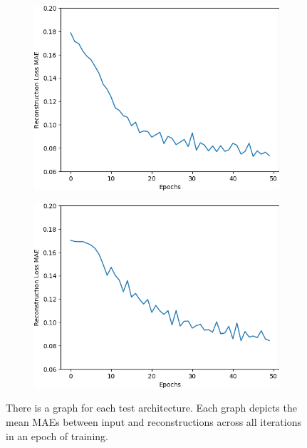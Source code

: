\begin{figure}[H]
    \centering
    \begin{subfigure}{.25\textwidth}
        \centering
        \includegraphics[width=\textwidth]
        {images/figures/experiments_architecture/mae_graphKernel5adjusted16x16x32_dim1024.png}
        \caption{}
    \end{subfigure}%
    \begin{subfigure}{.25\textwidth}
        \centering
        \includegraphics[width=\textwidth]
        {images/figures/experiments_architecture/mae_graphKernel5adjusted4x4x128_dim1024.png}
        \caption{}
    \end{subfigure}
    \caption{There is a graph for each test architecture.
    Each graph depicts the mean MAEs between input and reconstructions across all 
    iterations in an epoch of training.} \label{figure_learning_curves3}
\end{figure} 


